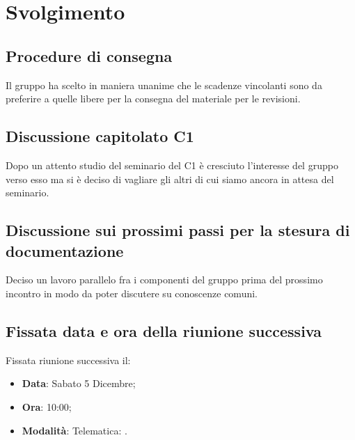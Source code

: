 \documentclass[]{article}
\begin{document}
	\newpage
	
	\section{Svolgimento}
		\subsection{Procedure di consegna}
		Il gruppo ha scelto in maniera unanime che le scadenze vincolanti sono da preferire a quelle libere per la consegna del materiale per le revisioni.\\
		
		\subsection{Discussione capitolato C1}
		Dopo un attento studio del seminario del  C1 è cresciuto l'interesse del gruppo verso esso ma si è deciso di vagliare gli altri  di cui siamo ancora in attesa del seminario. \\
		
		\subsection{Discussione sui prossimi passi per la stesura di documentazione}
		Deciso un lavoro parallelo fra i componenti del gruppo prima del
		prossimo incontro in modo da poter discutere su conoscenze comuni.\\
		
		\subsection{Fissata data e ora della riunione successiva}
		Fissata riunione successiva il:
		\begin{itemize}
			\item \textbf{Data}: Sabato 5 Dicembre;
			\item \textbf{Ora}: 10:00;
			\item \textbf{Modalità}: Telematica: .
		\end{itemize}	
	
\end{document}
